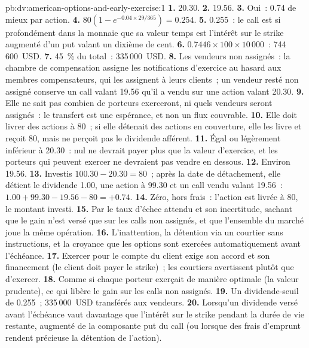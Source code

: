 \begin{solution}{pb:dv:american-options-and-early-exercise:1}
\textbf{1.} 20.30.
\textbf{2.} 19.56.
\textbf{3.} Oui~: 0.74 de mieux par action.
\textbf{4.} $80(1-e^{-0.04\times29/365})=0.254$.
\textbf{5.} 0.255~: le call est si profondément dans la monnaie que sa valeur temps est l'intérêt sur
le strike augmenté d'un put valant un dixième de cent.
\textbf{6.} $0.7446\times100\times10\,000$~: 744\,600~USD.
\textbf{7.} 45~\% du total~: 335\,000~USD.
\textbf{8.} Les vendeurs non assignés~: la chambre de compensation assigne les notifications d'exercice
au hasard aux membres compensateurs, qui les assignent à leurs clients~; un vendeur
resté non assigné conserve un call valant 19.56 qu'il a vendu sur une action valant 20.30.
\textbf{9.} Elle ne sait pas combien de porteurs exerceront, ni quels vendeurs seront
assignés~: le transfert est une espérance, et non un flux couvrable.
\textbf{10.} Elle doit livrer des actions à 80~; si elle détenait des actions en couverture, elle les livre
et reçoit 80, mais ne perçoit pas le dividende afférent.
\textbf{11.} Égal ou légèrement inférieur à 20.30~: nul ne devrait payer plus que la valeur d'exercice, et
les porteurs qui peuvent exercer ne devraient pas vendre en dessous.
\textbf{12.} Environ 19.56.
\textbf{13.} Investis $100.30-20.30=80$~; après la date de détachement, elle détient le dividende 1.00, une
action à 99.30 et un call vendu valant 19.56~: $1.00+99.30-19.56-80=+0.74$.
\textbf{14.} Zéro, hors frais~: l'action est livrée à 80, le montant investi.
\textbf{15.} Par le taux d'échec attendu et son incertitude, sachant que le gain n'est versé
que sur les calls non assignés, et que l'ensemble du marché joue la même opération.
\textbf{16.} L'inattention, la détention via un courtier sans instructions, et la croyance que
les options sont exercées automatiquement avant l'échéance.
\textbf{17.} Exercer pour le compte du client exige son accord et son financement (le
client doit payer le strike)~; les courtiers avertissent plutôt que d'exercer.
\textbf{18.} Comme si chaque porteur exerçait de manière optimale (la valeur prudente), ce qui libère le gain
sur les calls non assignés.
\textbf{19.} Un dividende-seuil de 0.255~; 335\,000~USD transférés aux vendeurs.
\textbf{20.} Lorsqu'un dividende versé avant l'échéance vaut davantage que l'intérêt sur le strike
pendant la durée de vie restante, augmenté de la composante put du call (ou lorsque des frais
d'emprunt rendent précieuse la détention de l'action).
\end{solution}


